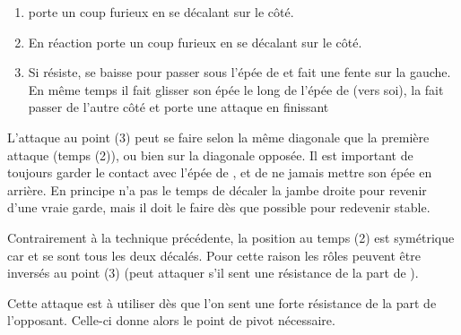 \begin{technique}[Abnemmen]
\label{épée-longue:tech:abnemmen}

\begin{enumerate}
	\item \A porte un coup furieux en se décalant sur le côté.
	
	\item En réaction \D porte un coup furieux en se décalant sur le côté.
	
	\item Si \A résiste, \D se baisse pour passer sous l'épée de \A et fait une fente sur la gauche.
	En même temps il fait glisser son épée le long de l'épée de \A (vers soi), la fait passer de l'autre côté et porte une attaque en finissant 
\end{enumerate}

L'attaque au point (3) peut se faire selon la même diagonale que la première attaque (temps (2)), ou bien sur la diagonale opposée.
Il est important de toujours garder le contact avec l'épée de \A, et de ne jamais mettre son épée en arrière.
En principe \D n'a pas le temps de décaler la jambe droite pour revenir d'une vraie garde, mais il doit le faire dès que possible pour redevenir stable.

Contrairement à la technique précédente, la position au temps (2) est symétrique car \A et \D se sont tous les deux décalés.
Pour cette raison les rôles peuvent être inversés au point (3) (\A peut attaquer s'il sent une résistance de la part de \D).

Cette attaque est à utiliser dès que l'on sent une forte résistance de la part de l'opposant.
Celle-ci donne alors le point de pivot nécessaire.

\end{technique}


